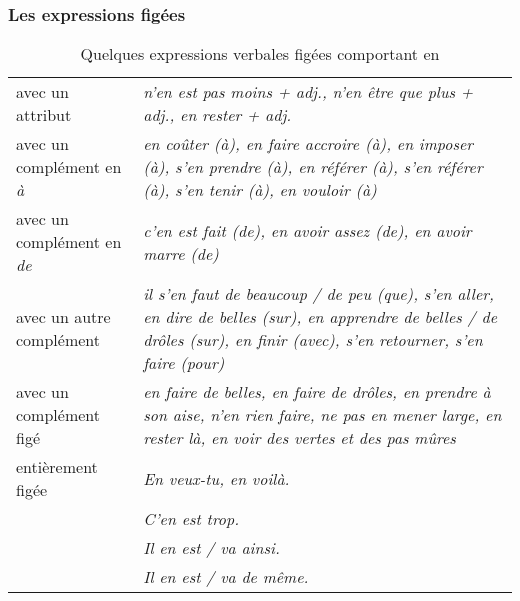 \documentclass[UTF8]{report}
\begin{document}
\subsubsection{Les expressions figées}
\begin{table}[H]
\centering
\begin{tabular}{|>{\RaggedRight\arraybackslash}m{4cm}|>{\RaggedRight\arraybackslash}m{9cm}|} %
\hline
\multicolumn{2}{|c|}{\textbf{EXPRESSION VERBALE}} \\
\hline
avec un attribut & \textit{n'en est pas moins + adj., n'en être que plus + adj., en rester + adj.} \\
\hline
avec un complément en \textit{à} & \textit{en coûter (à), en faire accroire (à), en imposer (à), s'en prendre (à), en référer (à), s'en référer (à), s'en tenir (à), en vouloir (à)} \\
\hline
avec un complément en \textit{de} & \textit{c'en est fait (de), en avoir assez (de), en avoir marre (de)} \\
\hline
avec un autre complément & \textit{il s'en faut de beaucoup / de peu (que), s'en aller, en dire de belles (sur), en apprendre de belles / de drôles (sur), en finir (avec), s'en retourner, s'en faire (pour)} \\
\hline
avec un complément figé & \textit{en faire de belles, en faire de drôles, en prendre à son aise, n'en rien faire, ne pas en mener large, en rester là, en voir des vertes et des pas mûres} \\
\hline
entièrement figée & \textit{En veux-tu, en voilà.} \\
& \textit{C'en est trop.} \\
& \textit{Il en est / va ainsi.} \\
& \textit{Il en est / va de même.} \\
\hline
\end{tabular}
\caption{Quelques expressions verbales figées comportant en
}
\end{table}
\end{document}
